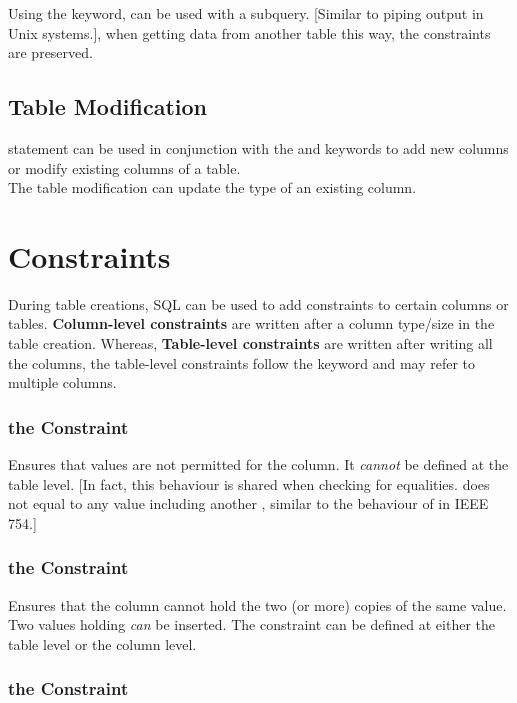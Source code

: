 \documentclass[11pt,a4paper,twocolumn]{book}
\begin{document}
Using the  keyword,  can be used with a subquery. [Similar to piping output in Unix systems.], when getting data from another table this way, the constraints are preserved.

\subsection{Table Modification}

 statement can be used in conjunction with the  and  keywords to add new columns or modify existing columns of a table.\\

The table modification can update the type of an existing column.

\section{Constraints}

During table creations, SQL can be used to add constraints to certain columns or tables. \textbf{Column-level constraints} are written after a column type/size in the table creation. Whereas, \textbf{Table-level constraints} are written after writing all the columns, the table-level constraints follow the  keyword and may refer to multiple columns.

\subsubsection{the  Constraint}

Ensures that  values are not permitted for the column. It \textit{cannot} be defined at the table level. [In fact, this behaviour is shared when checking for equalities.  does not equal to any value including another , similar to the behaviour of  in IEEE 754.]

\subsubsection{the  Constraint}

Ensures that the column cannot hold the two (or more)  copies of the same value. Two values holding  \textit{can} be inserted. The  constraint can be defined at either the table level or the column level.

\subsubsection{the  Constraint}
\end{document}
